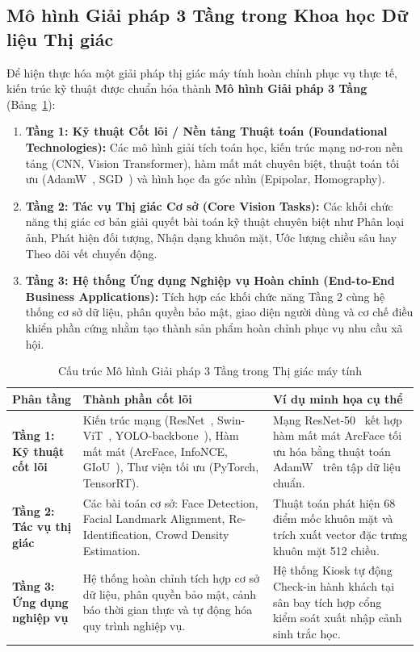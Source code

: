 \subsection{Mô hình Giải pháp 3 Tầng trong Khoa học Dữ liệu Thị giác}

Để hiện thực hóa một giải pháp thị giác máy tính hoàn chỉnh phục vụ thực tế, kiến trúc kỹ thuật được chuẩn hóa thành \textbf{Mô hình Giải pháp 3 Tầng} (Bảng~\ref{tab:three_tier_cv_architecture}):
\begin{enumerate}
    \item \textbf{Tầng 1: Kỹ thuật Cốt lõi / Nền tảng Thuật toán (Foundational Technologies):} Các mô hình giải tích toán học, kiến trúc mạng nơ-ron nền tảng (CNN, Vision Transformer), hàm mất mát chuyên biệt, thuật toán tối ưu (AdamW~\citep{loshchilov2019decoupled}, SGD~\citep{robbins1951stochastic}) và hình học đa góc nhìn (Epipolar, Homography).
    \item \textbf{Tầng 2: Tác vụ Thị giác Cơ sở (Core Vision Tasks):} Các khối chức năng thị giác cơ bản giải quyết bài toán kỹ thuật chuyên biệt như Phân loại ảnh, Phát hiện đối tượng, Nhận dạng khuôn mặt, Ước lượng chiều sâu hay Theo dõi vết chuyển động.
    \item \textbf{Tầng 3: Hệ thống Ứng dụng Nghiệp vụ Hoàn chỉnh (End-to-End Business Applications):} Tích hợp các khối chức năng Tầng 2 cùng hệ thống cơ sở dữ liệu, phân quyền bảo mật, giao diện người dùng và cơ chế điều khiển phần cứng nhằm tạo thành sản phẩm hoàn chỉnh phục vụ nhu cầu xã hội.
\end{enumerate}

\begin{table}[H]
\centering
\small
\caption{Cấu trúc Mô hình Giải pháp 3 Tầng trong Thị giác máy tính}
\label{tab:three_tier_cv_architecture}
\renewcommand{\arraystretch}{1.3}
\begin{tabularx}{\textwidth}{|p{2.8cm}|X|X|}
\hline
\textbf{Phân tầng} & \textbf{Thành phần cốt lõi} & \textbf{Ví dụ minh họa cụ thể} \\
\hline
\textbf{Tầng 1: Kỹ thuật cốt lõi} & Kiến trúc mạng (ResNet~\citep{he2016deep}, Swin-ViT~\citep{liu2021swin}, YOLO-backbone~\citep{redmon2016you}), Hàm mất mát (ArcFace, InfoNCE, GIoU~\citep{rezatofighi2019generalized}), Thư viện tối ưu (PyTorch, TensorRT). & Mạng ResNet-50~\citep{he2016deep} kết hợp hàm mất mát ArcFace tối ưu hóa bằng thuật toán AdamW~\citep{loshchilov2019decoupled} trên tập dữ liệu chuẩn. \\
\hline
\textbf{Tầng 2: Tác vụ thị giác} & Các bài toán cơ sở: Face Detection, Facial Landmark Alignment, Re-Identification, Crowd Density Estimation. & Thuật toán phát hiện 68 điểm mốc khuôn mặt và trích xuất vector đặc trưng khuôn mặt 512 chiều. \\
\hline
\textbf{Tầng 3: Ứng dụng nghiệp vụ} & Hệ thống hoàn chỉnh tích hợp cơ sở dữ liệu, phân quyền bảo mật, cảnh báo thời gian thực và tự động hóa quy trình nghiệp vụ. & Hệ thống Kiosk tự động Check-in hành khách tại sân bay tích hợp cổng kiểm soát xuất nhập cảnh sinh trắc học. \\
\hline
\end{tabularx}
\end{table}

